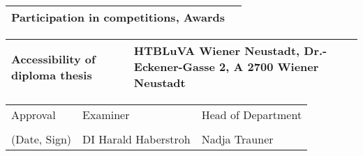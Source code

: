 \begin{center}
    \vspace{5mm}
    
    \begin{tabular}{| m{8cm} | m{8cm} |}
        \hline
        Participation in competitions, Awards & \\ 
        \hline
    \end{tabular}
    
    \vspace{5mm}
    
    \begin{tabular}{| m{8cm} | m{8cm} |}
        \hline
        Accessibility of diploma thesis & HTBLuVA Wiener Neustadt, Dr.-Eckener-Gasse 2, A 2700 Wiener Neustadt\\ 
        \hline
    \end{tabular}
    
    \vspace{5mm}
    
    \begin{tabular}{| m{5cm} | m{6cm} | m{5cm} |}
        \hline
        Approval & Examiner & Head of Department\\
        &&\\
        (Date, Sign) & DI Harald Haberstroh & Nadja Trauner\\ %
        \hline
    \end{tabular}
    
    \end{center}